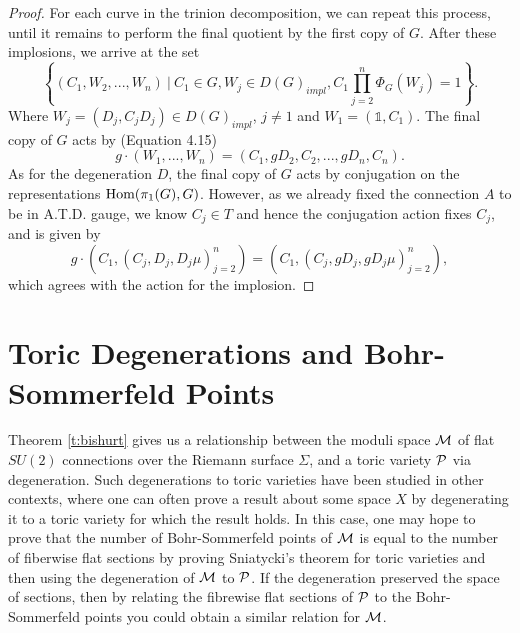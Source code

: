 \begin{proof}
		For each curve in the trinion decomposition, we can repeat this process, until it remains to perform the final quotient by the first copy of $G$. After these implosions, we arrive at the set
		\begin{equation}
			\left\{
			(C_1,W_2,...,W_n) ~|~ C_1 \in G, W_j \in D(G)_{impl}, C_1\prod_{j=2}^{n}\Phi_G(W_j) = 1	
			\right\}. 
		\end{equation}
		Where $W_j = (D_j,C_jD_j) \in D(G)_{impl}$, $j\neq 1$ and $W_1 = (\mathds{1},C_1)$. The final copy of $G$ acts by (Equation 4.15)
		\begin{equation}
			g\cdot(W_1,...,W_{n}) = (C_1,gD_2,C_2,...,gD_n, C_n). 
		\end{equation}
		As for the degeneration $D$, the final copy of $G$ acts by conjugation on the representations $\text{Hom}(\pi_1(G),G)$. However, as we already fixed the connection $A$ to be in A.T.D. gauge, we know $C_j \in T$ and hence the conjugation action fixes $C_j$, and is given by
		\begin{equation}
			g \cdot (C_1,(C_j,D_j, D_j\mu)_{j=2}^n) = (C_1, (C_j, gD_j, gD_j\mu)_{j=2}^n),
		\end{equation}
		which agrees with the action for the implosion. 
	\end{proof}
	
	\section{Toric Degenerations and Bohr-Sommerfeld Points}
	
	Theorem \ref{t:bishurt} gives us a relationship between the moduli space $\mathcal{M}$ of flat $SU(2)$ connections over the Riemann surface $\Sigma$, and a toric variety $\mathcal{P}$ via degeneration. Such degenerations to toric varieties have been studied in other contexts, where one can often prove a result about some space $X$ by degenerating it to a toric variety for which the result holds. In this case, one may hope to prove that the number of Bohr-Sommerfeld points of $\mathcal{M}$ is equal to the number of fiberwise flat sections by proving Sniatycki's theorem for toric varieties and then using the degeneration of $\mathcal{M}$ to $\mathcal{P}$. If the degeneration preserved the space of sections, then by relating the fibrewise flat sections of $\mathcal{P}$ to the Bohr-Sommerfeld points you could obtain a similar relation for $\mathcal{M}$. 
	
